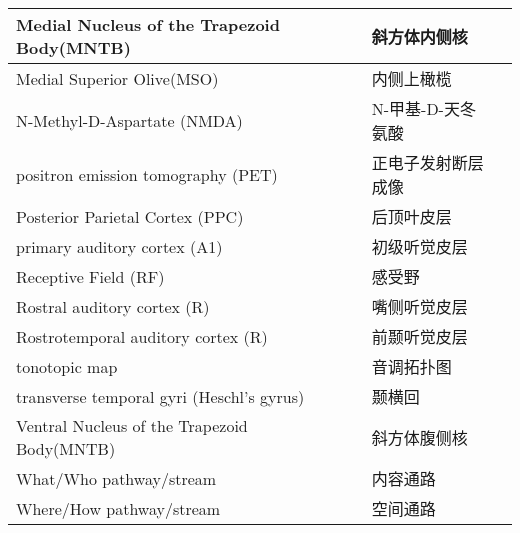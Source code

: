 \begin{table}[htbp]
{\begin{tabular}{llll}
		\midrule
		Medial Nucleus of the Trapezoid Body(MNTB)   && 斜方体内侧核  \\
		
		\midrule
		Medial Superior 		Olive(MSO)   && 内侧上橄榄  \\
		
		\midrule
		N-Methyl-D-Aspartate (NMDA)   && N-甲基-D-天冬氨酸  \\
		
		\midrule
		positron emission tomography (PET)     && 正电子发射断层成像   \\
		
		\midrule
		Posterior Parietal Cortex (PPC)     && 后顶叶皮层   \\
		
		\midrule
		primary auditory cortex (A1)   && 初级听觉皮层  \\
		
		\midrule
		Receptive Field (RF)   && 感受野  \\
		
		\midrule
		Rostral auditory cortex (R)   && 嘴侧听觉皮层  \\
		
		\midrule
		Rostrotemporal auditory cortex (R)   && 前颞听觉皮层 \\
		
		\midrule
		tonotopic map   && 音调拓扑图  \\
		
		\midrule
		transverse temporal gyri (Heschl's gyrus)   && 颞横回  \\
		
		\midrule
		Ventral Nucleus of the Trapezoid Body(MNTB)   && 斜方体腹侧核  \\
		
		\midrule
		What/Who pathway/stream  && 内容通路  \\
		
		\midrule
		Where/How pathway/stream && 空间通路  \\
		
		
		\bottomrule  

	\end{tabular}}
\end{table}%


